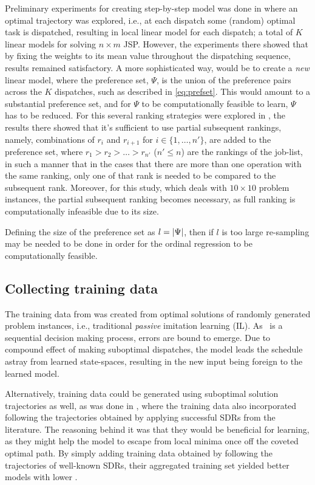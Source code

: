\documentclass[smallextended]{svjour3}
\begin{document}
Preliminary experiments for creating step-by-step model was done in 
\cite{InRu11a} where an optimal trajectory was explored, i.e., at each dispatch 
some (random) optimal task is dispatched, resulting in local linear model for 
each dispatch; a total of $K$ linear models for solving $n\times m$ JSP. 
However, the experiments there showed that by fixing the weights to its mean 
value throughout the dispatching sequence, results remained satisfactory.
A more sophisticated way, would be to create a \emph{new} linear model, where 
the preference set, $\Psi$, is the union of the preference pairs across the 
$K$ dispatches, such as described in \cref{eq:prefset}. 
This would amount to a substantial preference set, and for $\Psi$ to be 
computationally feasible to learn, $\Psi$ has to be reduced. For this several 
ranking strategies were explored in \cite{InRu15a}, the results there showed 
that it's sufficient to use partial subsequent rankings, namely, combinations 
of $r_i$ and $r_{i+1}$ for $i\in\{1,\ldots,n'\}$, are added to the preference 
set, where $r_1>r_2>\ldots>r_{n'}$ ($n'\leq n$) are the rankings of the 
job-list, in such a manner that in the cases that there are more than one 
operation with the same ranking, only one of that rank is needed to be compared 
to the subsequent rank. 
Moreover, for this study, which deals with $10\times 10$ problem instances, 
the partial subsequent ranking becomes necessary, as full ranking is 
computationally infeasible due to its size. 

Defining the size of the preference set as $l=\lvert\Psi\rvert$, then if  $l$ is too 
large re-sampling may be needed to be done in order for the ordinal regression 
to be computationally feasible. 

\subsection{Collecting training data}

The training data from \cite{InRu11a} was created from optimal solutions of 
randomly generated problem instances, i.e., traditional \emph{passive} 
imitation learning (IL). 
As \JSP\ is a sequential decision making process, errors are bound to emerge.  
Due to compound effect of making suboptimal dispatches, the model leads the 
schedule astray from learned state-spaces, resulting in the new input being 
foreign to the learned model. 

Alternatively, training data could be generated using suboptimal solution 
trajectories as well, as was done in \cite{InRu15a}, where the training data 
also incorporated following the trajectories obtained by applying successful 
SDRs from the literature. 
The reasoning behind it was that  they would be beneficial for learning, 
as they might help the model to escape from local minima once off the coveted 
optimal path. 
By simply adding training data obtained by following the trajectories of 
well-known SDRs, their aggregated training set yielded better models with lower 
\fullnamerho. 
\end{document}
